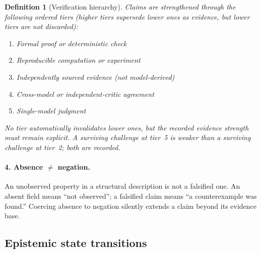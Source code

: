 \documentclass[11pt]{article}
\theoremstyle{gowthm}
\newtheorem{definition}{Definition}[section]
\theoremstyle{gowplain}
\begin{document}
\begin{definition}[Verification hierarchy]
Claims are strengthened through the following ordered tiers (higher tiers
supersede lower ones as evidence, but lower tiers are not discarded):
\begin{enumerate}[nosep,label=\arabic*.]
  \item Formal proof or deterministic check
  \item Reproducible computation or experiment
  \item Independently sourced evidence (not model-derived)
  \item Cross-model or independent-critic agreement
  \item Single-model judgment
\end{enumerate}
No tier automatically invalidates lower ones, but the recorded evidence strength
must remain explicit. A surviving challenge at tier~5 is weaker than a surviving
challenge at tier~2; both are recorded.
\end{definition}

\paragraph{4. Absence $\neq$ negation.}
An unobserved property in a structural description is not a falsified one.
An absent field means ``not observed''; a falsified claim means ``a
counterexample was found.'' Coercing absence to negation silently extends a
claim beyond its evidence base.

\subsection{Epistemic state transitions}
\end{document}

